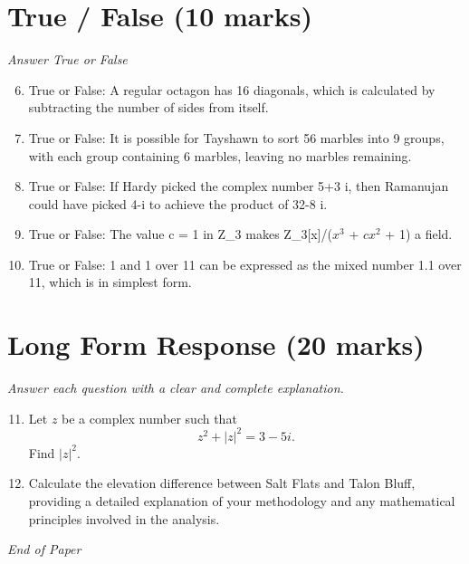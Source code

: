 \documentclass[12pt]{article}
\begin{document}
\section*{True / False (10 marks)}
\textit{Answer True or False}
\begin{enumerate}[label=\arabic*.]
\setcounter{enumi}{5}
\item True or False: A regular octagon has 16 diagonals, which is calculated by subtracting the number of sides from itself.
\item True or False: It is possible for Tayshawn to sort 56 marbles into 9 groups, with each group containing 6 marbles, leaving no marbles remaining.
\item True or False: If Hardy picked the complex number 5+3 i, then Ramanujan could have picked 4-i to achieve the product of 32-8 i.
\item True or False: The value c = 1 in Z\_3 makes Z\_3[x]/($x^3$ + $cx^2$ + 1) a field.
\item True or False: 1 and 1 over 11 can be expressed as the mixed number 1.1 over 11, which is in simplest form.
\end{enumerate}

\section*{Long Form Response (20 marks)}
\textit{Answer each question with a clear and complete explanation.}
\begin{enumerate}[label=\arabic*.]
\setcounter{enumi}{10}
\item Let $z$ be a complex number such that \[z^2 + |z|^2 = 3 - 5 i.\]Find $|z|^2.$
\item Calculate the elevation difference between Salt Flats and Talon Bluff, providing a detailed explanation of your methodology and any mathematical principles involved in the analysis.
\end{enumerate}

\vfill
\noindent\textit{End of Paper}
\end{document}
